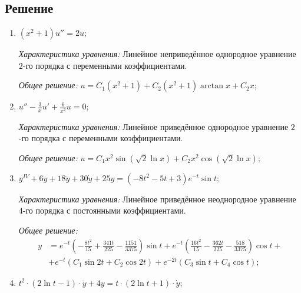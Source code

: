     \subsection{Решение}
        \begin{enumerate}            
            \item \( \left( x^2 + 1 \right) u'' = 2u; \)
            
                \textit{Характеристика уравнения:}
                    Линейное неприведённое однородное уравнение \(2\)-го порядка с переменными коэффициентами.
                
                \textit{Общее решение:}
                    \( u = C_1 \left( x^2 + 1 \right) + C_2\left( x^2 + 1 \right) \arctan{x} + C_2 x; \)

            
            \item \( u'' - \frac{3}{x}u' + \frac{6}{x^2}u = 0; \)
            
                \textit{Характеристика уравнения:}
                    Линейное приведённое однородное уравнение \(2\)-го порядка с переменными коэффициентами.
                
                \textit{Общее решение:}
                    \( u = C_1 x^2 \sin\left( \sqrt{2} \ln{x} \right) + C_2 x^2 \cos\left( \sqrt{2} \ln{x} \right); \)

            
            \item \( y^{IV} + 6 \dddot{y} + 18 \ddot{y} + 30 \dot{y} + 25 y = \left( -8t^2 - 5t + 3 \right) e^{-t} \sin{t}; \)
            
                \textit{Характеристика уравнения:}
                    Линейное приведённое неоднородное уравнение \(4\)-го порядка с постоянными коэффициентами.
                
                \textit{Общее решение:}
                    \[ 
                        \begin{aligned} 
                            y &= e^{-t} \left( -\frac{8 t^2}{15} + \frac{341 t}{225} -\frac{1151}{3375}\right) \sin{t} + e^{-t}\left( \frac{16 t^2}{15} - \frac{362t}{225} - \frac{518}{3375}\right)\cos{t} + \\
                            &+ e^{-t} \left( C_1 \sin {2t} + C_2 \cos{2t} \right) + e^{-2t} \left( C_3 \sin{t} + C_4 \cos{t} \right);
                        \end{aligned}
                    \]
            



            \item \( t^2 \cdot \left( 2 \ln{t} - 1 \right) \cdot \ddot{y} + 4y = t \cdot \left( 2\ln{t} + 1 \right) \cdot \dot{y}; \)
            

\end{enumerate}
